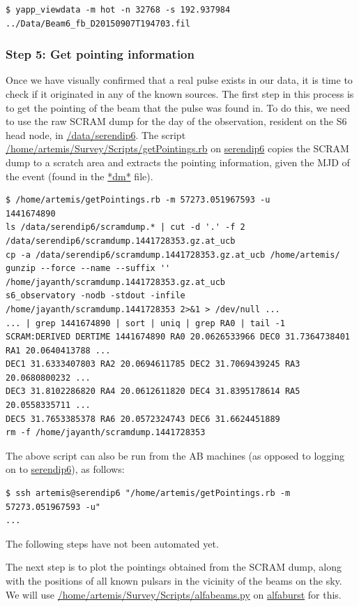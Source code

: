 \documentclass{article}
\begin{document}
\small{
\begin{verbatim}
$ yapp_viewdata -m hot -n 32768 -s 192.937984 ../Data/Beam6_fb_D20150907T194703.fil
\end{verbatim}
}

\subsubsection*{Step 5: Get pointing information}

Once we have visually confirmed that a real pulse exists in our data, it is
time to check if it originated in any of the known sources. The first step in
this process is to get the pointing of the beam that the pulse was found in. To
do this, we need to use the raw SCRAM dump for the day of the observation,
resident on the S6 head node, in \url{/data/serendip6}. The script
\url{/home/artemis/Survey/Scripts/getPointings.rb} on \url{serendip6} copies
the SCRAM dump to a scratch area and extracts the pointing information, given
the MJD of the event (found in the \url{*dm*} file).

\small{
\begin{verbatim}
$ /home/artemis/getPointings.rb -m 57273.051967593 -u
1441674890
ls /data/serendip6/scramdump.* | cut -d '.' -f 2
/data/serendip6/scramdump.1441728353.gz.at_ucb
cp -a /data/serendip6/scramdump.1441728353.gz.at_ucb /home/artemis/
gunzip --force --name --suffix '' /home/jayanth/scramdump.1441728353.gz.at_ucb
s6_observatory -nodb -stdout -infile /home/jayanth/scramdump.1441728353 2>&1 > /dev/null ...
... | grep 1441674890 | sort | uniq | grep RA0 | tail -1
SCRAM:DERIVED DERTIME 1441674890 RA0 20.0626533966 DEC0 31.7364738401 RA1 20.0640413788 ...
DEC1 31.6333407803 RA2 20.0694611785 DEC2 31.7069439245 RA3 20.0680800232 ...
DEC3 31.8102286820 RA4 20.0612611820 DEC4 31.8395178614 RA5 20.0558335711 ...
DEC5 31.7653385378 RA6 20.0572324743 DEC6 31.6624451889
rm -f /home/jayanth/scramdump.1441728353
\end{verbatim}
}

The above script can also be run from the AB machines (as opposed to logging on
to \url{serendip6}), as follows:

\small{
\begin{verbatim}
$ ssh artemis@serendip6 "/home/artemis/getPointings.rb -m 57273.051967593 -u"
...
\end{verbatim}
}

The following steps have not been automated yet.

The next step is to plot the pointings obtained from the SCRAM dump, along with
the positions of all known pulsars in the vicinity of the beams on the sky. We
will use \url{/home/artemis/Survey/Scripts/alfabeams.py} on \url{alfaburst} for
this.
\end{document}
